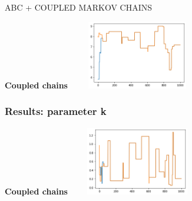\documentclass{beamer}
\begin{document}
\begin{section}{ABC + COUPLED MARKOV CHAINS}
\begin{frame}
\begin{center}
		{\scriptsize \textbf{Coupled chains}}
		\includegraphics[width=6cm,height=3cm]{immagini_mario/g_all_chains}
		
		
	\end{center}
\end{frame}
\begin{frame}
	\frametitle{Results: parameter k}
	\begin{center}
		
		{\scriptsize \textbf{Coupled chains}}
		\includegraphics[width=6cm,height=3cm]{immagini_mario/k_all_chains}
		
		
		
	\end{center}
\end{frame}
\end{section}
\end{document}
